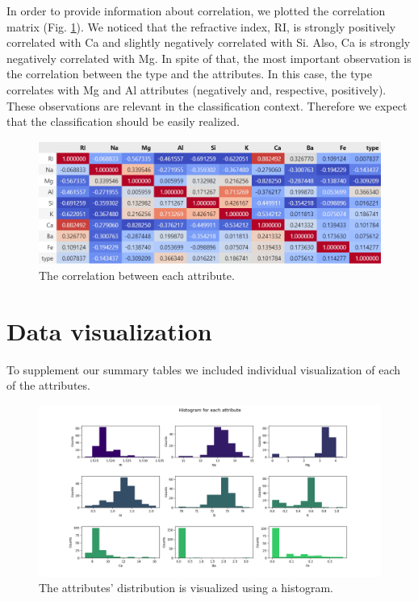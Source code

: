\documentclass[12pt]{article}
\begin{document}
In order to provide information about correlation, we plotted the correlation matrix (Fig. \ref{fig:correlation_matrix}). We noticed that the refractive index, RI, is strongly positively correlated with Ca and slightly negatively correlated with Si. Also, Ca is strongly negatively correlated with Mg. In spite of that, the most important observation is the correlation between the type and the attributes. In this case, the type correlates with Mg and Al attributes (negatively and, respective, positively). These observations are relevant in the classification context. Therefore we expect that the classification should be easily realized.
\begin{figure}[H]
        \centering
    	\includegraphics[width=\linewidth]{image/correlation_matrix.png}
    	\caption{The correlation between each attribute.}
    	\label{fig:correlation_matrix}
\end{figure}

\section{Data visualization}
To supplement our summary tables we included individual visualization of each of the attributes. 
    \begin{figure}[H]
        \centering
    	\includegraphics[width=\linewidth]{image/histogram_for_each_attribute.png}
    	\caption{The attributes' distribution is visualized using a histogram.}
    	\label{fig:histogram}
    \end{figure}
    
\end{document}
